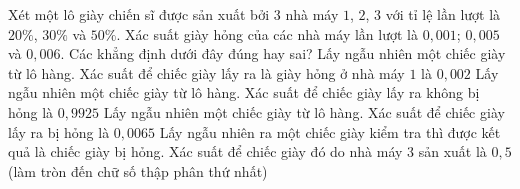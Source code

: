 \documentclass[12pt,a4paper]{article}
\begin{document}
\begin{ex}%
Xét một lô giày chiến sĩ được sản xuất bởi $3$ nhà máy $1$, $2$, $3$ với tỉ lệ lần lượt là $20\%$, $30\%$ và $50\%$. Xác suất giày hỏng của các nhà máy lần lượt là $0,001$; $0,005$ và $0,006$. Các khẳng định dưới đây đúng hay sai?
\choiceTF
{\True Lấy ngẫu nhiên một chiếc giày từ lô hàng. Xác suất để chiếc giày lấy ra là giày hỏng ở nhà máy $1$ là $0,002$ }
{Lấy ngẫu nhiên một chiếc giày từ lô hàng. Xác suất để chiếc giày lấy ra không bị hỏng là $0,9925$}
{\True Lấy ngẫu nhiên một chiếc giày từ lô hàng. Xác suất để chiếc giày lấy ra bị hỏng là $0,0065$}
{Lấy ngẫu nhiên ra một chiếc giày kiểm tra thì được kết quả là chiếc giày bị hỏng. Xác suất để chiếc giày đó do nhà máy $3$ sản xuất là $0,5$ (làm tròn đến chữ số thập phân thứ nhất)}
\end{ex}

    
\end{document}
